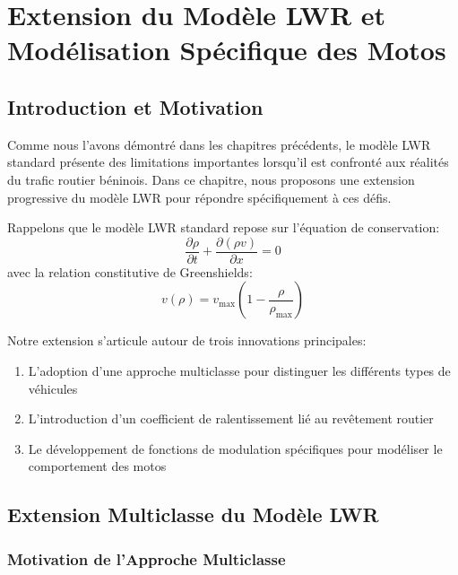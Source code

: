 \chapter{Extension du Modèle LWR et Modélisation Spécifique des Motos}
\label{chap:extension_modele}

\section{Introduction et Motivation}
\label{sec:intro_motivation}

Comme nous l'avons démontré dans les chapitres précédents, le modèle LWR standard présente des limitations importantes lorsqu'il est confronté aux réalités du trafic routier béninois. Dans ce chapitre, nous proposons une extension progressive du modèle LWR pour répondre spécifiquement à ces défis.

Rappelons que le modèle LWR standard repose sur l'équation de conservation:
\begin{equation}
\frac{\partial \rho}{\partial t} + \frac{\partial(\rho v)}{\partial x} = 0
\end{equation}
avec la relation constitutive de Greenshields:
\begin{equation}
v(\rho) = v_{\max}\left(1 - \frac{\rho}{\rho_{\max}}\right)
\end{equation}

Notre extension s'articule autour de trois innovations principales:
\begin{enumerate}
\item L'adoption d'une approche multiclasse pour distinguer les différents types de véhicules
\item L'introduction d'un coefficient de ralentissement lié au revêtement routier
\item Le développement de fonctions de modulation spécifiques pour modéliser le comportement des motos
\end{enumerate}

\section{Extension Multiclasse du Modèle LWR}
\label{sec:extension_multiclasse}

\subsection{Motivation de l'Approche Multiclasse}
\label{subsec:motivation_multiclasse}

